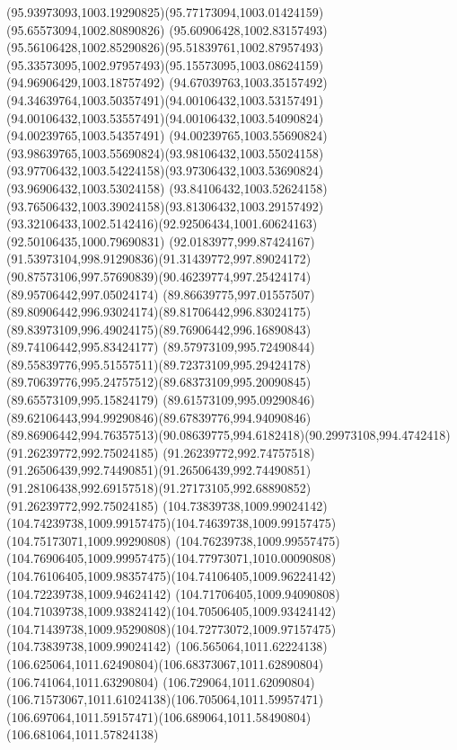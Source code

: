 {    \curveto(95.93973093,1003.19290825)(95.77173094,1003.01424159)(95.65573094,1002.80890826)
    \curveto(95.60906428,1002.83157493)(95.56106428,1002.85290826)(95.51839761,1002.87957493)
    \curveto(95.33573095,1002.97957493)(95.15573095,1003.08624159)(94.96906429,1003.18757492)
    \curveto(94.67039763,1003.35157492)(94.34639764,1003.50357491)(94.00106432,1003.53157491)
    \curveto(94.00106432,1003.53557491)(94.00106432,1003.54090824)(94.00239765,1003.54357491)
    \curveto(94.00239765,1003.55690824)(93.98639765,1003.55690824)(93.98106432,1003.55024158)
    \curveto(93.97706432,1003.54224158)(93.97306432,1003.53690824)(93.96906432,1003.53024158)
    \curveto(93.84106432,1003.52624158)(93.76506432,1003.39024158)(93.81306432,1003.29157492)
    \curveto(93.32106433,1002.5142416)(92.92506434,1001.60624163)(92.50106435,1000.79690831)
    \curveto(92.0183977,999.87424167)(91.53973104,998.91290836)(91.31439772,997.89024172)
    \curveto(90.87573106,997.57690839)(90.46239774,997.25424174)(89.95706442,997.05024174)
    \curveto(89.86639775,997.01557507)(89.80906442,996.93024174)(89.81706442,996.83024175)
    \curveto(89.83973109,996.49024175)(89.76906442,996.16890843)(89.74106442,995.83424177)
    \curveto(89.57973109,995.72490844)(89.55839776,995.51557511)(89.72373109,995.29424178)
    \curveto(89.70639776,995.24757512)(89.68373109,995.20090845)(89.65573109,995.15824179)
    \curveto(89.61573109,995.09290846)(89.62106443,994.99290846)(89.67839776,994.94090846)
    \curveto(89.86906442,994.76357513)(90.08639775,994.6182418)(90.29973108,994.4742418)
    \moveto(91.26239772,992.75024185)
    \curveto(91.26239772,992.74757518)(91.26506439,992.74490851)(91.26506439,992.74490851)
    \curveto(91.28106438,992.69157518)(91.27173105,992.68890852)(91.26239772,992.75024185)
    \moveto(104.73839738,1009.99024142)
    \curveto(104.74239738,1009.99157475)(104.74639738,1009.99157475)(104.75173071,1009.99290808)
    \curveto(104.76239738,1009.99557475)(104.76906405,1009.99957475)(104.77973071,1010.00090808)
    \curveto(104.76106405,1009.98357475)(104.74106405,1009.96224142)(104.72239738,1009.94624142)
    \curveto(104.71706405,1009.94090808)(104.71039738,1009.93824142)(104.70506405,1009.93424142)
    \curveto(104.71439738,1009.95290808)(104.72773072,1009.97157475)(104.73839738,1009.99024142)
    \moveto(106.565064,1011.62224138)
    \curveto(106.625064,1011.62490804)(106.68373067,1011.62890804)(106.741064,1011.63290804)
    \curveto(106.729064,1011.62090804)(106.71573067,1011.61024138)(106.705064,1011.59957471)
    \curveto(106.697064,1011.59157471)(106.689064,1011.58490804)(106.681064,1011.57824138)
}
